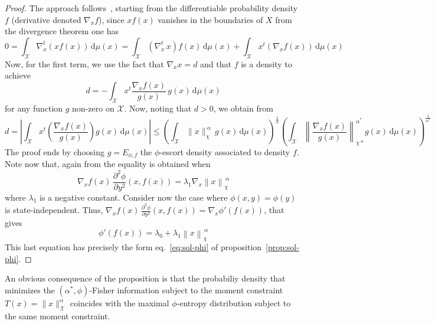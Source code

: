 \documentclass[english,sort&compress]{elsarticle}
\theoremstyle{definition}
\theoremstyle{plain}
\theoremstyle{plain}
\def\dmu{\mathrm{d}\mu}
\def\X{\mathcal{X}}
\begin{document}
\begin{proof}
  The   approach   follows~\cite{Ber13},   starting  from   the   differentiable
  probability  density $f$  (derivative denoted  $\nabla_x f$),  since  $x f(x)$
  vanishes in the boundaries of $X$ from the divergence theorem one has
  \[
  0  =  \int_\X  \nabla_x^t \left(  x  f(x)  \right)  \, \dmu(x) =  \int_\X  \left(
    \nabla_x^t  \, x \right)  f(x) \, \dmu(x)  + \int_\X  x^t \left(  \nabla_x f(x)
  \right) \, \dmu(x)
  \]
  Now, for the first term, we use the fact that $\nabla_x x = d$ and that $f$ is
  a density to achieve
  \[
  d = - \int_\X x^t \frac{\nabla_x f(x)}{g(x)} \, g(x) \, \dmu(x)
  \]
  for any function  $g$ non-zero on $\X$.   Now, noting that $d >  0$, we obtain
  from \cite[Lemma~2]{Ber13}
  \[
  d  =  \left| \int_\X x^t \left( \frac{\nabla_x f(x)}{g(x)} \right) g(x)
  \, \dmu(x) \right| \le  \left( \int_\X \|x\|_\chi^{\: \alpha} \, g(x) \, \dmu(x)
  \right)^{\frac{1}{\alpha}} \left( \int_\X \left\| \frac{\nabla_x
  f(x)}{g(x)}\right\|_{\chi*}^{\alpha^*} g(x) \, \dmu(x) \right)^{\frac{1}{\alpha^*}}
  \]
  The  proof  ends  by  choosing  $g =  E_{\phi,f}$  the  $\phi$-escort  density
  associated to density $f$. Note now that, again from \cite[Lemma~2]{Ber13} the
  equality is obtained when
  \[
  \nabla_x  f(x) \,  \frac{\partial^2 \phi}{\partial  y^2} (x,f(x))  = \lambda_1
  \nabla_x \left\| x \right\|_\chi^{\, \alpha}
  \]
  where  $\lambda_1$  is a  negative  constant.   Consider  now the  case  where
  $\phi(x,y)  =   \phi(y)$  is   state-independent.  Thus,  $\nabla_x   f(x)  \,
  \frac{\partial^2  \phi}{\partial y^2} (x,f(x))  = \nabla_x  \phi'(f(x))$, that
  gives
  \[
  \phi'(f(x)) = \lambda_0 + \lambda_1 \left\| x \right\|_\chi^{\, \alpha}
  \]
  This  last   equation  has   precisely  the  form   eq.~\eqref{eq:sol-phi}  of
  proposition~\ref{prop:sol-phi}.
\end{proof}
%
An obvious  consequence of the proposition  is that the probabiliy  density that
minimizes  the  $(\alpha^*,\phi)$-Fisher  information   subject  to  the  moment
constraint $T(x)  = \|x\|_\X^\alpha$  coincides with the  maximal $\phi$-entropy
distribution subject to the same moment constraint.
\end{document}
